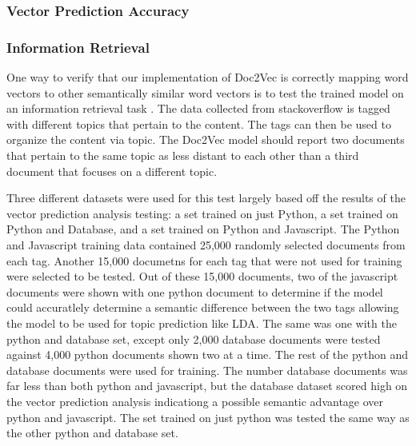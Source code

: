 \subsubsection{Vector Prediction Accuracy}
%
%
%
%

\subsubsection{Information Retrieval}

One way to verify that our implementation of Doc2Vec is correctly mapping word vectors to other semantically similar word vectors is to test the trained model on an information retrieval task . \cite{RefWorks:doc:5a6e5746e4b0d609eec798d7} The data collected from stackoverflow is tagged with different topics that pertain to the content. The tags can then be used to organize the content via topic. The Doc2Vec model should report two documents that pertain to the same topic as less distant to each other than a third document that focuses on a different topic.

Three different datasets were used for this test largely based off the results of the vector prediction analysis testing: a set trained on just Python, a set trained on Python and Database, and a set trained on Python and Javascript. The Python and Javascript training data contained 25,000 randomly selected documents from each tag. Another 15,000 documetns for each tag that were not used for training were selected to be tested. Out of these 15,000 documents, two of the javascript documents were shown with one python document to determine if the model could accuratlely determine a semantic difference between the two tags allowing the model to be used for topic prediction like LDA. The same was one with the python and database set, except only 2,000 database documents were tested against 4,000 python documents shown two at a time. The rest of the python and database documents were used for training. The number database documents was far less than both python and javascript, but the database dataset scored high on the vector prediction analysis indicationg a possible semantic advantage over python and javascript. The set trained on just python was tested the same way as the other python and database set.


